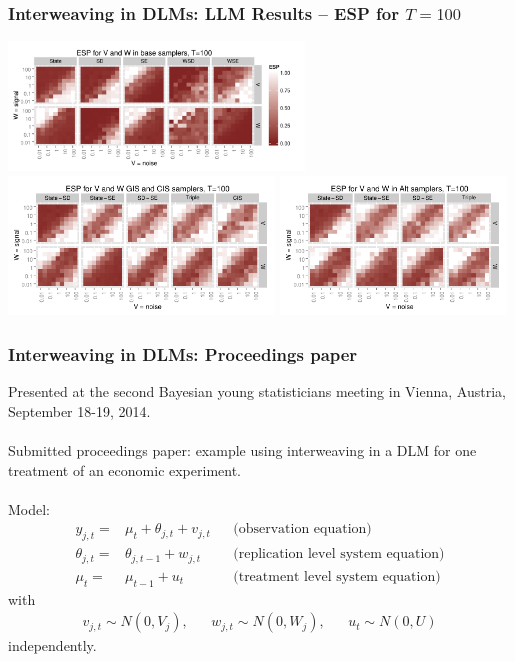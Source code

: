 \documentclass[xcolor=dvipsnames]{beamer}
\begin{document}
\begin{frame}
\frametitle{Interweaving in DLMs: LLM Results -- ESP for $T=100$}
\centering
\includegraphics[width=0.59\textwidth]{../dlmasis/doc/plots/basecisESplot100}\\
\includegraphics[width=0.53\textwidth]{../dlmasis/doc/plots/altintESplotV100}
\includegraphics[width=0.45\textwidth]{../dlmasis/doc/plots/altintESplotW100}
\end{frame}

\begin{frame}
\frametitle{Interweaving in DLMs: Proceedings paper}

Presented at the second Bayesian young statisticians meeting in Vienna, Austria, September 18-19, 2014.\\~\\

Submitted proceedings paper: example using interweaving in a DLM for one treatment of an economic experiment.\\~\\

\pause Model:
\begin{align*}
y_{j,t} =& \mu_t + \theta_{j,t} + v_{j,t}&&\mbox{(observation equation)} \nonumber\\
\theta_{j,t}=&\theta_{j,t-1} + w_{j,t}&&\mbox{(replication level system equation)}\nonumber\\
\mu_t=&\mu_{t-1} + u_t&&\mbox{(treatment level system equation)}
\end{align*}
with
\begin{align*}
v_{j,t}\sim N(0,V_j), && w_{j,t}\sim N(0,W_j), && u_t\sim N(0,U)
\end{align*}
independently.

\end{frame}
\end{document}
